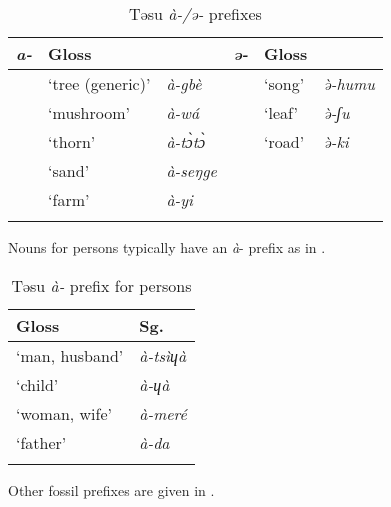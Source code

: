 \documentclass[output=paper]{langsci/langscibook}
\begin{document}
\begin{table} 
\caption{Təsu \textit{à-/ə-} prefixes}
\label{extab:nomaffplat:43}
\begin{tabularx}{.8\textwidth}{lQl lll}
 \lsptoprule
\itshape a- 	& Gloss 	&    {} 	& \textit{ə-} 	& Gloss 	&    {}\\
\midrule
	& ‘tree (generic)’  	& \textit{à-gbè} 	&  	& ‘song’ 	&  \itshape ə̀-humu  \\
	& ‘mushroom’ 	&  \itshape à-wá 	&  	& ‘leaf’ 	&  \itshape ə̀-ʃu\\
	& ‘thorn’ 	&  \itshape à-tɔ̀tɔ̀ 	&  	& ‘road’ 	&  \itshape ə̀-ki\\
	& ‘sand’ 	&  \textit{à-seŋge} 	&  	&  	& \\
	& ‘farm’ 	&  \itshape à-yi 	&  	&  	& \\
 \lspbottomrule
\end{tabularx}
\end{table}

  
  
Nouns for persons typically have an \textit{à}- prefix as in .

\begin{table}
\caption{Təsu \textit{à-} prefix for persons}
    \label{extab:nomaffplat:44} 
\begin{tabularx}{.8\textwidth}{Xl}
 \lsptoprule
Gloss 	& Sg. \\
\midrule
‘man, husband’ 	&  \itshape à-tsìɥà\\
‘child’        	& \itshape à-ɥà\\
‘woman, wife’ 	&  \itshape à-meré\\
‘father’ 	&  \itshape à-da\\
\lspbottomrule
\end{tabularx}
\end{table}


Other fossil prefixes are given in .
\end{document}
